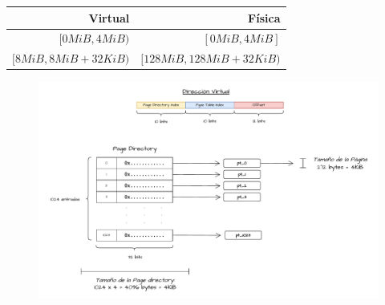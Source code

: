 \documentclass[12pt]{article}
\begin{document}
\begin{center}
\begin{tabular}{r|r}
Virtual & Física \\
\hline
$[0 M i B, 4 M i B)$ & $[0 M i B, 4 M i B]$ \\
$[8 M i B, 8 M i B+32 K i B)$ & $[128 M i B, 128 M i B+32 K i B)$ \\
\end{tabular}
\end{center}

\begin{figure}[h]
    \centering
    \includegraphics[width=1\textwidth]{ej142.pdf}
\end{figure}
\end{document}

